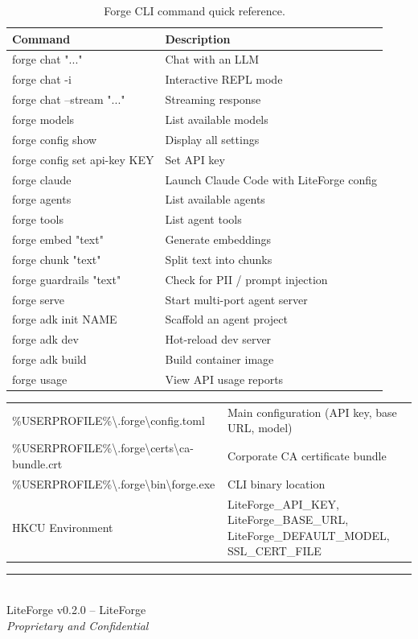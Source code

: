 \documentclass[11pt,letterpaper]{article}
\begin{document}
\begin{table}[H]
\centering
\renewcommand{\arraystretch}{1.3}
\begin{tabularx}{\textwidth}{@{}>{\ttfamily\small}l X@{}}
\toprule
\textnormal{\textbf{Command}} & \textbf{Description} \\
\midrule
forge chat "..." & Chat with an LLM \\
forge chat -i & Interactive REPL mode \\
forge chat --stream "..." & Streaming response \\
forge models & List available models \\
forge config show & Display all settings \\
forge config set api-key KEY & Set API key \\
forge claude & Launch Claude Code with LiteForge config \\
forge agents & List available agents \\
forge tools & List agent tools \\
forge embed "text" & Generate embeddings \\
forge chunk "text" & Split text into chunks \\
forge guardrails "text" & Check for PII / prompt injection \\
forge serve & Start multi-port agent server \\
forge adk init NAME & Scaffold an agent project \\
forge adk dev & Hot-reload dev server \\
forge adk build & Build container image \\
forge usage & View API usage reports \\
\bottomrule
\end{tabularx}
\caption{Forge CLI command quick reference.}
\end{table}

\begin{tcolorbox}[infobox={Configuration Locations (Windows)}]
\begin{tabularx}{\textwidth}{@{}>{\ttfamily\small}l X@{}}
\%USERPROFILE\%\textbackslash.forge\textbackslash config.toml & Main configuration (API key, base URL, model) \\
\%USERPROFILE\%\textbackslash.forge\textbackslash certs\textbackslash ca-bundle.crt & Corporate CA certificate bundle \\
\%USERPROFILE\%\textbackslash.forge\textbackslash bin\textbackslash forge.exe & CLI binary location \\
HKCU Environment & LiteForge\_API\_KEY, LiteForge\_BASE\_URL, LiteForge\_DEFAULT\_MODEL, SSL\_CERT\_FILE \\
\end{tabularx}
\end{tcolorbox}

\vfill

\begin{center}
\small\color{forgegray}
\rule{0.6\textwidth}{0.4pt}\\[6pt]
LiteForge v0.2.0 -- LiteForge\\
\textcolor{alertred}{\textit{Proprietary and Confidential}}
\end{center}
\end{document}
